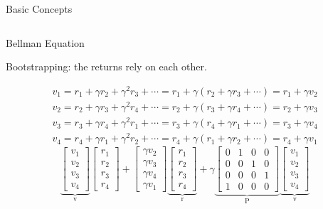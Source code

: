 \documentclass[UTF8, 10pt]{beamer}
\begin{document}
\begin{CJK*}{UTF8}{gbsn}
\begin{frame}{Basic Concepts}
\begin{columns}
\begin{itemize}
	\end{itemize}
	\end{columns}
\end{frame}
\begin{frame}{Bellman Equation}
	\begin{center}
		Bootstrapping: the returns rely on each other.
	\end{center}
	$$
	\begin{array}{l}
	v_{1}=r_{1}+\gamma r_{2}+\gamma^{2} r_{3}+\cdots=r_{1}+\gamma\left(r_{2}+\gamma r_{3}+\cdots\right)=r_{1}+\gamma v_{2} 
	\\
	 v_{2}=r_{2}+\gamma r_{3}+\gamma^{2} r_{4}+\cdots=r_{2}+\gamma\left(r_{3}+\gamma r_{4}+\cdots\right)=r_{2}+\gamma v_{3} 
	 \\ 
	 v_{3}=r_{3}+\gamma r_{4}+\gamma^{2} r_{1}+\cdots=r_{3}+\gamma\left(r_{4}+\gamma r_{1}+\cdots\right)=r_{3}+\gamma v_{4} 
	 \\ 
	 v_{4}=r_{4}+\gamma r_{1}+\gamma^{2} r_{2}+\cdots=r_{4}+\gamma\left(r_{1}+\gamma r_{2}+\cdots\right)=r_{4}+\gamma v_{1} 
	\end{array}
	$$
	$$
	\underbrace{\left[\begin{array}{l}v_{1} \\ v_{2} \\ v_{3} \\ v_{4}\end{array}\right]}_{\mathrm{v}}
	\left[\begin{array}{l}r_{1} \\ r_{2} \\ r_{3} \\ r_{4}\end{array}\right]
	+\left[\begin{array}{l}\gamma v_{2} \\ \gamma v_{3} \\ \gamma v_{4} \\ \gamma v_{1}\end{array}\right]
	\underbrace{\left[\begin{array}{l}r_{1} \\ r_{2} \\ r_{3} \\ r_{4}\end{array}\right]}_{\mathrm{r}}+\gamma \underbrace{\left[\begin{array}{llll}0 & 1 & 0 & 0 \\ 0 & 0 & 1 & 0 \\ 0 & 0 & 0 & 1 \\ 1 & 0 & 0 & 0\end{array}\right]}_{\mathrm{P}} \underbrace{\left[\begin{array}{l}v_{1} \\ v_{2} \\ v_{3} \\ v_{4}\end{array}\right]}_{\mathrm{v}}
$$
\end{frame}
\end{CJK*}
\end{document}
